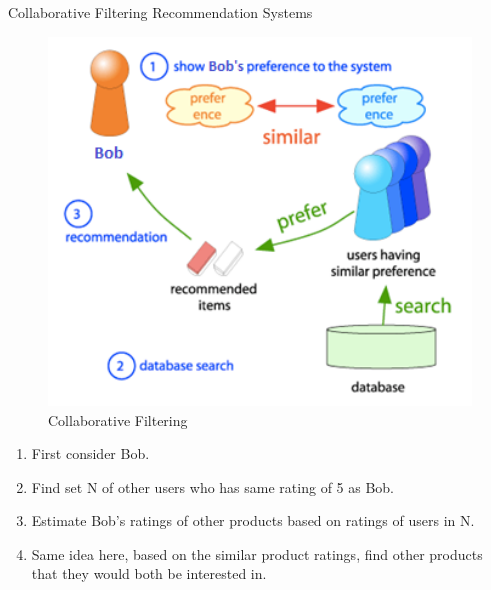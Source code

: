 \documentclass{beamer}
\begin{document}
\begin{frame}{Collaborative Filtering Recommendation Systems}{}
\begin{minipage}{0.5\textwidth}
    \begin{figure}[H]
    \includegraphics[width=1\textwidth]{image/cf_example_flow}
    \caption{\label{fig:CF} Collaborative Filtering}
    \end{figure}
    \end{minipage} \hfill
    \begin{minipage}{0.45\textwidth}
  \begin{enumerate}
      \item {
        First consider Bob.
      }
      \item {
        Find set N of other users who has same rating of 5 as Bob.
      }
      \item {
        Estimate Bob's ratings of other products based on ratings of users in N.
      }
      \item {
        Same idea here, based on the similar product ratings, find other products that they would both be interested in.
      }
  \end{enumerate}
  \end{minipage}

\end{frame}

\end{document}
